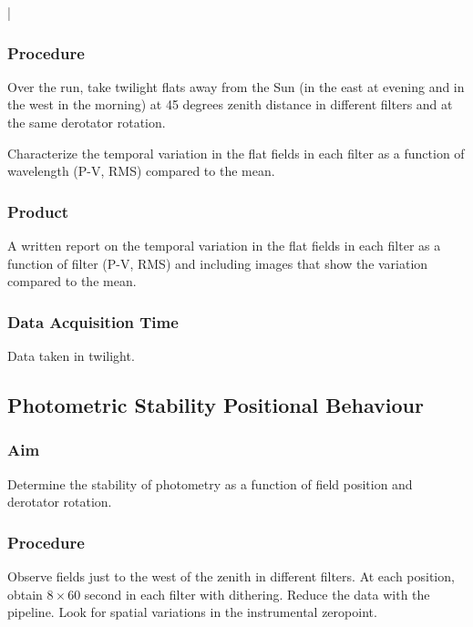 |\documentclass{article}
\begin{document}
\subsubsection{Procedure}

Over the run, take twilight flats away from the Sun (in the east at evening and in the west in the morning) at 45 degrees zenith distance in different filters and at the same derotator rotation.

Characterize the temporal variation in the flat fields in each filter as a function of wavelength (P-V, RMS) compared to the mean.

\subsubsection{Product}

A written report on the temporal variation in the flat fields in each filter as a function of filter (P-V, RMS) and including images that show the variation compared to the mean.

\subsubsection{Data Acquisition Time}

Data taken in twilight.


\subsection{Photometric Stability Positional Behaviour}

\subsubsection{Aim}

Determine the stability of photometry as a function of field position and derotator rotation.

\subsubsection{Procedure}

Observe fields just to the west of the zenith in different filters. At each position, obtain $8 \times 60$ second in each filter with dithering. Reduce the data with the pipeline. Look for spatial variations in the instrumental zeropoint.
\end{document}

